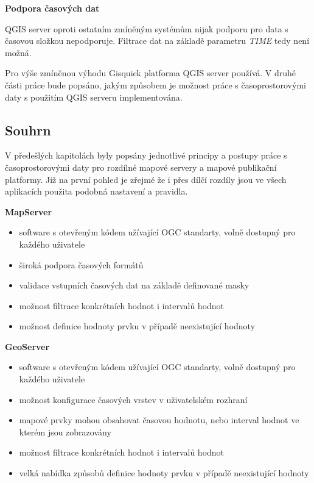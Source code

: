 \bigskip
\noindent \textbf{Podpora časových dat}

QGIS server oproti ostatním zmíněným systémům nijak podporu pro data s
časovou složkou nepodporuje. Filtrace dat na základě parametru
\textit{TIME} tedy není možná.

Pro výše zmíněnou výhodu Gisquick platforma QGIS server používá. V
druhé části práce bude popsáno, jakým způsobem je možnost práce s
časoprostorovými daty s použitím QGIS serveru implementována.

\newpage
\subsection{Souhrn} V předešlých kapitolách byly popsány jednotlivé
principy a postupy práce s časoprostorovými daty pro rozdílné mapové
servery a mapové publikační platformy. Již na první pohled je zřejmé
že i přes dílčí rozdíly jsou ve všech aplikacích použita podobná
nastavení a pravidla.

\bigskip
\noindent \textbf{MapServer}
\begin{itemize}
	\item software s otevřeným kódem užívající OGC standarty,
volně dostupný pro každého uživatele
	\item široká podpora časových formátů
	\item validace vstupních časových dat na základě definované
masky
	\item možnost filtrace konkrétních hodnot i intervalů hodnot
	\item možnost definice hodnoty prvku v případě neexistující
hodnoty
\end{itemize}

\textbf{GeoServer}
\begin{itemize}
	\item software s otevřeným kódem užívající OGC standarty,
volně dostupný pro každého uživatele
	\item možnost konfigurace časových vrstev v uživatelském
rozhraní
	\item mapové prvky mohou obsahovat časovou hodnotu, nebo
interval hodnot ve kterém jsou zobrazovány
	\item možnost filtrace konkrétních hodnot i intervalů hodnot
	\item velká nabídka způsobů definice hodnoty prvku v případě
neexistující hodnoty
\end{itemize}

